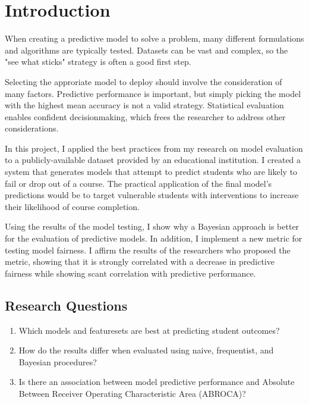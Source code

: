 \documentclass{article}
\begin{document}
\section{Introduction}
        When creating a predictive model to solve a problem, many different formulations and algorithms are typically tested.
        Datasets can be vast and complex, so the "see what sticks" strategy is often a good first step.

        Selecting the approriate model to deploy should involve the consideration of many factors.
        Predictive performance is important, but simply picking the model with the highest mean accuracy is not a valid strategy.
        Statistical evaluation enables confident decisionmaking, which frees the researcher to address other considerations.

        In this project, I applied the best practices from my research on model evaluation to a publicly-available dataset provided by an educational institution.
        I created a system that generates models that attempt to predict students who are likely to fail or drop out of a course.
        The practical application of the final model's predictions would be to target vulnerable students with interventions to increase their likelihood of course completion. 

        Using the results of the model testing, I show why a Bayesian approach is better for the evaluation of predictive models. 
        In addition, I implement a new metric for testing model fairness. 
        I affirm the results of the researchers who proposed the metric, showing that it is strongly correlated with a decrease in predictive fairness while showing scant correlation with predictive performance.
    
    \subsection{Research Questions}
        \begin{enumerate}
            \item Which models and featuresets are best at predicting student outcomes?
            \item How do the results differ when evaluated using naive, frequentist, and Bayesian procedures?
            \item Is there an association between model predictive performance and Absolute Between Receiver Operating Characteristic Area (ABROCA)?
        \end{enumerate}
    
\end{document}
